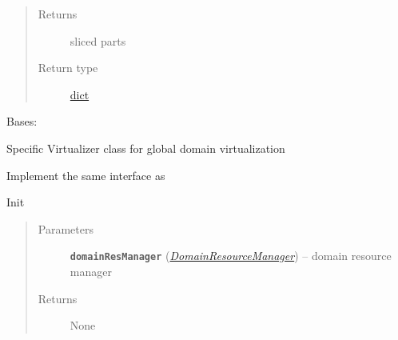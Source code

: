 \documentclass[letterpaper,10pt,english]{sphinxmanual}
\begin{document}
\begin{fulllineitems}
\begin{fulllineitems}
\begin{quote}
\begin{description}
\item[{Returns}] \leavevmode
sliced parts

\item[{Return type}] \leavevmode
\href{https://docs.python.org/2.7/library/stdtypes.html\#dict}{dict}

\end{description}\end{quote}

\end{fulllineitems}


\end{fulllineitems}


\begin{fulllineitems}
\label{adapt/adaptation:escape.adapt.adaptation.DomainVirtualizer}
Bases: {\hyperref[orchest/virtualization_mgmt:escape.orchest.virtualization_mgmt.AbstractVirtualizer]{\emph{}}}

Specific Virtualizer class for global domain virtualization

Implement the same interface as {\hyperref[orchest/virtualization_mgmt:escape.orchest.virtualization_mgmt.AbstractVirtualizer]{\emph{}}}

\begin{fulllineitems}
\label{adapt/adaptation:escape.adapt.adaptation.DomainVirtualizer.__init__}
Init
\begin{quote}\begin{description}
\item[{Parameters}] \leavevmode
\textbf{\texttt{domainResManager}} ({\hyperref[adapt/adaptation:escape.adapt.adaptation.DomainResourceManager]{\emph{\emph{DomainResourceManager}}}}) -- domain resource manager

\item[{Returns}] \leavevmode
None

\end{description}\end{quote}

\end{fulllineitems}


\end{fulllineitems}
\end{document}
